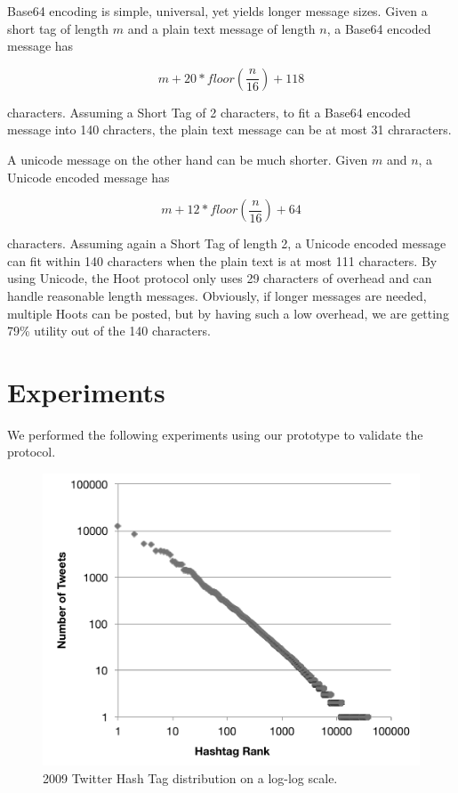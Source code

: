 \documentclass{acm_proc_article-sp}
\begin{document}
Base64 encoding is simple, universal, yet yields longer message sizes. Given a short tag of length $m$ and a plain text message of length $n$, a Base64 encoded message has

\begin{equation}
	m + 20 * floor(\frac{n}{16}) + 118
\end{equation}

characters. Assuming a Short Tag of 2 characters, to fit a Base64 encoded message into 140 chracters, the plain text message can be at most 31 chraracters.

A unicode message on the other hand can be much shorter. Given $m$ and $n$, a Unicode encoded message has

\begin{equation}
	m + 12 * floor(\frac{n}{16}) + 64
\end{equation}

characters. Assuming again a Short Tag of length 2, a Unicode encoded message can fit within 140 characters when the plain text is at most 111 characters. By using Unicode, the Hoot protocol only uses 29 characters of overhead and can handle reasonable length messages. Obviously, if longer messages are needed, multiple Hoots can be posted, but by having such a low overhead, we are getting 79\% utility out of the 140 characters.

\section{Experiments}

We performed the following experiments using our prototype to validate the protocol.

\begin{figure}[hash-dist]
\begin{center}
\includegraphics[scale=.25]{graphs/hash-tag-dist.pdf}
\caption{2009 Twitter Hash Tag distribution on a log-log scale.}
\end{center}
\end{figure}
\end{document}
